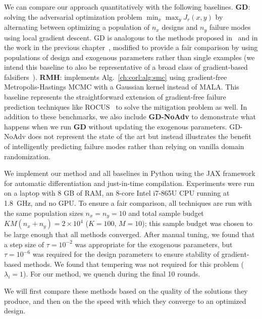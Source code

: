 {We can compare our approach quantitatively with the following baselines. \textbf{GD}: solving the adversarial optimization problem $\min_x \max_y J_r(x, y)$ by alternating between optimizing a population of $n_x$ designs and $n_y$ failure modes using local gradient descent. GD is analogous to the methods proposed in~\cite{dontiAdversariallyRobustLearning2021} and in the work in the previous chapter~\cite{dawsonRobustCounterexampleguidedOptimization2022b}, modified to provide a fair comparison by using populations of design and exogenous parameters rather than single examples (we intend this baseline to also be representative of a broad class of gradient-based falsifiers~\cite{xuAdversarialAttacksDefenses2020}). \textbf{RMH}: implements Alg.~\ref{ch:corl:alg:smc} using gradient-free Metropolis-Hastings MCMC with a Gaussian kernel instead of MALA. This baseline represents the straightforward extension of gradient-free failure prediction techniques like ROCUS~\cite{zhouRoCUSRobotController2021} to solve the mitigation problem as well. In addition to these benchmarks, we also include \textbf{GD-NoAdv} to demonstrate what happens when we run \textbf{GD} without updating the exogenous parameters. GD-NoAdv does not represent the state of the art but instead illustrates the benefit of intelligently predicting failure modes rather than relying on vanilla domain randomization.

We implement our method and all baselines in Python using the JAX framework for automatic differentiation and just-in-time compilation. Experiments were run on a laptop with 8 GB of RAM, an 8-core Intel i7-865U CPU running at \SI{1.8}{GHz}, and no GPU. To ensure a fair comparison, all techniques are run with the same population sizes $n_x = n_y = 10$ and total sample budget $KM(n_x + n_y) = 2\times 10^4$ ($K = 100$, $M = 10$); this sample budget was chosen to be large enough that all methods converged. After manual tuning, we found that a step size of $\tau = 10^{-2}$ was appropriate for the exogenous parameters, but $\tau = 10^{-6}$ was required for the design parameters to ensure stability of gradient-based methods. We found that tempering was not required for this problem ($\lambda_i = 1$). For our method, we quench during the final 10 rounds.

We will first compare these methods based on the quality of the solutions they produce, and then on the the speed with which they converge to an optimized design.

}
